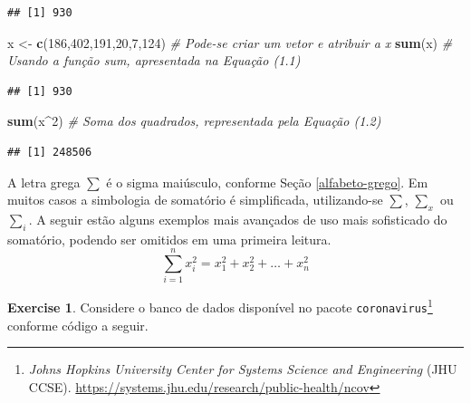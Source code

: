 \documentclass[
]{book}
\newenvironment{Shaded}{\begin{snugshade}}{\end{snugshade}}
\newcommand{\CommentTok}[1]{\textcolor[rgb]{0.56,0.35,0.01}{\textit{#1}}}
\newcommand{\DecValTok}[1]{\textcolor[rgb]{0.00,0.00,0.81}{#1}}
\newcommand{\KeywordTok}[1]{\textcolor[rgb]{0.13,0.29,0.53}{\textbf{#1}}}
\newcommand{\NormalTok}[1]{#1}
\newcommand{\OperatorTok}[1]{\textcolor[rgb]{0.81,0.36,0.00}{\textbf{#1}}}
\newcommand{\StringTok}[1]{\textcolor[rgb]{0.31,0.60,0.02}{#1}}
\theoremstyle{definition}
\theoremstyle{definition}
\theoremstyle{definition}
\newtheorem{exercise}{Exercise}[chapter]
\theoremstyle{remark}
\begin{document}
\begin{verbatim}
## [1] 930
\end{verbatim}

\begin{Shaded}
\begin{Highlighting}[]
\NormalTok{x \textless{}{-}}\StringTok{ }\KeywordTok{c}\NormalTok{(}\DecValTok{186}\NormalTok{,}\DecValTok{402}\NormalTok{,}\DecValTok{191}\NormalTok{,}\DecValTok{20}\NormalTok{,}\DecValTok{7}\NormalTok{,}\DecValTok{124}\NormalTok{)    }\CommentTok{\# Pode{-}se criar um vetor e atribuir a x}
\KeywordTok{sum}\NormalTok{(x)                          }\CommentTok{\# Usando a função \textquotesingle{}sum\textquotesingle{}, apresentada na Equação (1.1)}
\end{Highlighting}
\end{Shaded}

\begin{verbatim}
## [1] 930
\end{verbatim}

\begin{Shaded}
\begin{Highlighting}[]
\KeywordTok{sum}\NormalTok{(x}\OperatorTok{\^{}}\DecValTok{2}\NormalTok{)                        }\CommentTok{\# Soma dos quadrados, representada pela Equação (1.2)}
\end{Highlighting}
\end{Shaded}

\begin{verbatim}
## [1] 248506
\end{verbatim}

A letra grega \(\sum\) é o sigma maiúsculo, conforme Seção \ref{alfabeto-grego}. Em muitos casos a simbologia de somatório é simplificada, utilizando-se \(\sum\), \(\sum_{x}\) ou \(\sum_{i}\). A seguir estão alguns exemplos mais avançados de uso mais sofisticado do somatório, podendo ser omitidos em uma primeira leitura.
\begin{equation}
\sum_{i=1}^n x_{i}^2 = x_{1}^2 + x_{2}^2 + \ldots + x_{n}^2
\label{eq:soma-quad}  
\end{equation}

\begin{exercise}
\protect\hypertarget{exr:corona}{}{\label{exr:corona} }Considere o banco de dados disponível no pacote \texttt{coronavirus}\footnote{\emph{Johns Hopkins University Center for Systems Science and Engineering} (JHU CCSE). \url{https://systems.jhu.edu/research/public-health/ncov}} conforme código a seguir.
\end{exercise}
\end{document}

